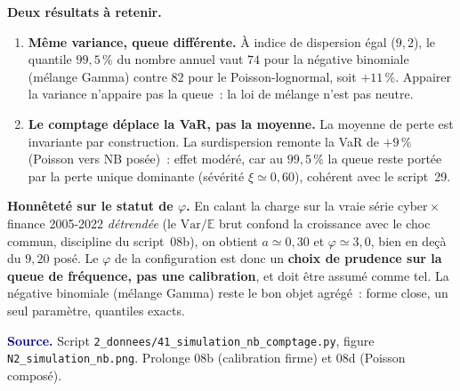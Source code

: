 \documentclass[11pt,a4paper]{article}
\begin{document}
\begin{cle}
\textbf{Deux résultats à retenir.}
\begin{enumerate}\itemsep2pt
\item \textbf{Même variance, queue différente.} À indice de dispersion égal ($9{,}2$), le
quantile $99{,}5\,\%$ du nombre annuel vaut $74$ pour la négative binomiale (mélange Gamma)
contre $82$ pour le Poisson-lognormal, soit $+11\,\%$. Appairer la variance n'appaire pas la
queue~: la loi de mélange n'est pas neutre.
\item \textbf{Le comptage déplace la VaR, pas la moyenne.} La moyenne de perte est invariante
par construction. La surdispersion remonte la VaR de $+9\,\%$ (Poisson vers NB posée)~: effet
modéré, car au $99{,}5\,\%$ la queue reste portée par la perte unique dominante (sévérité
$\xi\simeq 0{,}60$), cohérent avec le script~29.
\end{enumerate}
\end{cle}

\begin{cle}[colback=orange!8,colframe=orange!70!black]
\textbf{Honnêteté sur le statut de $\varphi$.} En calant la charge sur la vraie série
cyber\,$\times$\,finance 2005-2022 \emph{détrendée} (le $\mathrm{Var}/\mathbb{E}$ brut confond
la croissance avec le choc commun, discipline du script~08b), on obtient $a\simeq 0{,}30$ et
$\varphi\simeq 3{,}0$, bien en deçà du $9{,}20$ posé. Le $\varphi$ de la configuration est
donc un \textbf{choix de prudence sur la queue de fréquence, pas une calibration}, et doit
être assumé comme tel. La négative binomiale (mélange Gamma) reste le bon objet agrégé~: forme
close, un seul paramètre, quantiles exacts.
\end{cle}

\smallskip
\noindent\footnotesize\textcolor{navy}{\textbf{Source.}} Script
\texttt{2\_donnees/41\_simulation\_nb\_comptage.py}, figure \texttt{N2\_simulation\_nb.png}.
Prolonge 08b (calibration firme) et 08d (Poisson composé).
\end{document}
